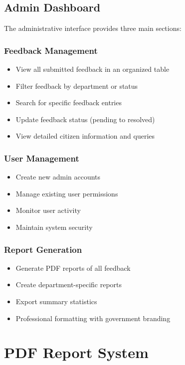 \documentclass[12pt,a4paper]{article}
\begin{document}
\subsection{Admin Dashboard}
The administrative interface provides three main sections:

\subsubsection{Feedback Management}
\begin{itemize}
    \item View all submitted feedback in an organized table
    \item Filter feedback by department or status
    \item Search for specific feedback entries
    \item Update feedback status (pending to resolved)
    \item View detailed citizen information and queries
\end{itemize}

\subsubsection{User Management}
\begin{itemize}
    \item Create new admin accounts
    \item Manage existing user permissions
    \item Monitor user activity
    \item Maintain system security
\end{itemize}

\subsubsection{Report Generation}
\begin{itemize}
    \item Generate PDF reports of all feedback
    \item Create department-specific reports
    \item Export summary statistics
    \item Professional formatting with government branding
\end{itemize}

\section{PDF Report System}
\end{document}
